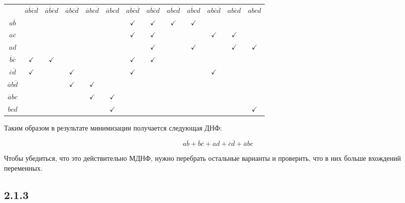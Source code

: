 \documentclass[a4paper,12pt]{article}
\begin{document}
\begin{table}[h!]
\centering
	\begin{tabular}{| c | *{12}{c} |}
	\hline
	& \cellcolor{pink} $\overline{a}\overline{b}\overline{c}\overline{d}$ & \cellcolor{pink} $\overline{a}\overline{b}\overline{c}d$ & $\overline{a}b\overline{c}\overline{d}$ & $\overline{a}bc\overline{d}$ & $\overline{a}bcd$ & \cellcolor{pink} $a\overline{b}\overline{c}\overline{d}$ & \cellcolor{pink} $a\overline{b}\overline{c}d$ & \cellcolor{pink} $a\overline{b}c\overline{d}$ & \cellcolor{pink} $a\overline{b}cd$ & $ab\overline{c}\overline{d}$ & $ab\overline{c}d$ & $abcd$ \\
	\rowcolor{lime} $a\overline{b}$ & & & & & & $\checkmark$ & $\checkmark$ & \textcircled{$\checkmark$} & $\checkmark$ & & & \\
	$a\overline{c}$ & & & & & & $\checkmark$ & $\checkmark$ & & & $\checkmark$ & $\checkmark$ &\\
	$ad$ & & & & & & & $\checkmark$ & & $\checkmark$ & & $\checkmark$ & $\checkmark$ \\
	\rowcolor{lime} $\overline{b}\overline{c}$ & $\checkmark$ & \textcircled{$\checkmark$} & & & & $\checkmark$ & $\checkmark$ & & & & & \\
	$\overline{c}\overline{d}$ & $\checkmark$ & & $\checkmark$ & & & $\checkmark$ & & & & $\checkmark$ & & \\

	$\overline{a}b\overline{d}$ & & & $\checkmark$ & $\checkmark$ & & & & & & & & \\
	$\overline{a}bc$ & & & & $\checkmark$ & $\checkmark$ & & & & & & & \\
	$bcd$ & & & & & $\checkmark$ & & & & & & & $\checkmark$ \\

	\hline
	\end{tabular}
\end{table}

Таким образом в результате минимизации получается следующая ДНФ:

\[a\overline{b} + \overline{b}\overline{c} + ad + \overline{c}\overline{d} + \overline{a}bc\]

Чтобы убедиться, что это действительно МДНФ, нужно перебрать остальные варианты и проверить, что в них больше вхождений переменных.




\subsection*{2.1.3}
\end{document}
